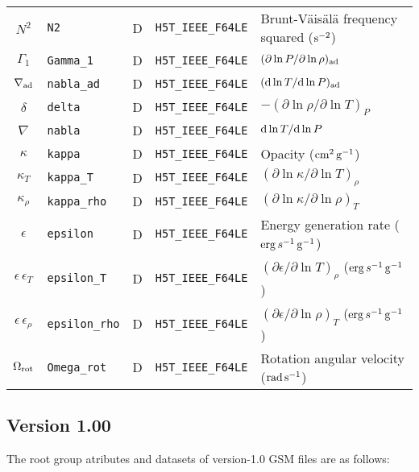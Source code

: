 \documentclass{article}
\newcommand{\diff}{\ensuremath{{\rm d}}}
\newcommand{\cm}{\ensuremath{{\rm cm}}}
\newcommand{\gram}{\ensuremath{{\rm g}}}
\newcommand{\second}{\ensuremath{{\rm s}}}
\newcommand{\erg}{\ensuremath{{\rm erg}}}
\begin{document}
\begin{table}[h!]
\begin{tabular}{|c|l|c|l|l|}
$N^{2}$           & \texttt{N2}           & D & \texttt{H5T\_IEEE\_F64LE} & Brunt-V\"ais\"al\"a frequency squared ($\second^{-2}$) \\
$\Gamma_{1}$      & \texttt{Gamma\_1}      & D & \texttt{H5T\_IEEE\_F64LE} & $(\partial \ln P/\partial \ln \rho)_{\rm ad}$ \\
$\nabla_{\rm ad}$  & \texttt{nabla\_ad}      & D & \texttt{H5T\_IEEE\_F64LE} & $(\diff \ln T/\diff \ln P)_{\rm ad}$ \\
$\delta$      & \texttt{delta}            & D & \texttt{H5T\_IEEE\_F64LE} & $-(\partial \ln \rho/\partial \ln T)_{P}$  \\
$\nabla$          & \texttt{nabla}        & D & \texttt{H5T\_IEEE\_F64LE} & $\diff \ln T/\diff \ln P$ \\
$\kappa$          & \texttt{kappa}       & D &  \texttt{H5T\_IEEE\_F64LE} & Opacity ($\cm^{2}\,\gram^{-1}$) \\
$\kappa_{T}$      & \texttt{kappa\_T}     & D &  \texttt{H5T\_IEEE\_F64LE} & $(\partial \ln \kappa/\partial \ln T)_{\rho}$ \\
$\kappa_{\rho}$   & \texttt{kappa\_rho}   & D &  \texttt{H5T\_IEEE\_F64LE} & $(\partial \ln \kappa/\partial \ln \rho)_{T}$ \\
$\epsilon$        & \texttt{epsilon}      & D &  \texttt{H5T\_IEEE\_F64LE} & Energy generation rate ($\erg\,s^{-1}\,\gram^{-1}$) \\
$\epsilon\,\epsilon_{T}$    & \texttt{epsilon\_T}   & D &  \texttt{H5T\_IEEE\_F64LE} & $(\partial \epsilon/\partial \ln T)_{\rho}$ ($\erg\,s^{-1}\,\gram^{-1}$) \\
$\epsilon\,\epsilon_{\rho}$ & \texttt{epsilon\_rho} & D &  \texttt{H5T\_IEEE\_F64LE} & $(\partial \epsilon/\partial \ln \rho)_{T}$ ($\erg\,s^{-1}\,\gram^{-1}$) \\
$\Omega_{\rm rot}$ & \texttt{Omega\_rot}   & D & \texttt{H5T\_IEEE\_F64LE} & Rotation angular velocity (${\rm rad}\,\second^{-1}$) \\  \hline
\end{tabular}
\end{table}

\newpage

\subsection*{Version 1.00}

The root group atributes and datasets of version-1.0 GSM files are as follows:
\end{document}
